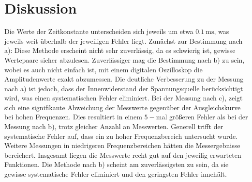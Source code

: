 \section{Diskussion}
\label{sec:Diskussion}
Die Werte der Zeitkonstante unterscheiden sich jeweils um etwa $\SI{0.1}{\milli\second}$, was jeweils weit überhalb der jeweiligen Fehler liegt.
Zunächst zur Bestimmung nach a):
Diese Methode erscheint nicht sehr zuverlässig, da es schwierig ist, gewisse Wertepaare sicher abzulesen.
Zuverlässiger mag die Bestimmung nach b) zu sein, wobei es auch nicht einfach ist, mit einem digitalen Oszilloskop die Amplitudenwerte exakt abzumessen.
Die deutliche Verbesserung zu der Messung nach a) ist jedoch, dass der Innenwiderstand der Spannungsquelle berücksichtigt wird, was einen systematischen Fehler eliminiert.
Bei der Messung nach c), zeigt sich eine signifikante Abweichung der Messwerte gegenüber der Ausgleichskurve bei hohen Frequenzen.
Dies resultiert in einem $5-$mal größeren Fehler als bei der Messung nach b), trotz gleicher Anzahl an Messwerten.
Generell trifft der systematische Fehler auf, dass ein zu hoher Frequenzbereich untersucht wurde.
Weitere Messungen in niedrigeren Frequenzbereichen hätten die Messergebnisse bereichert.
Insgesamt liegen die Messwerte recht gut auf den jeweilig erwarteten Funktionen.
Die Methode nach b) scheint am zuverlässigsten zu sein, da sie gewisse systematische Fehler eliminiert und den geringsten Fehler innehält.  
